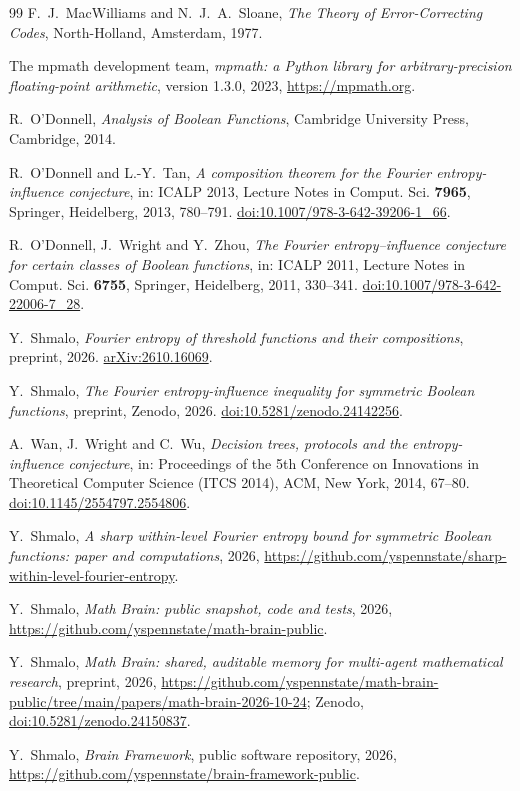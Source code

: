 \documentclass[11pt]{amsart}
\theoremstyle{remark}
\begin{document}
\begin{thebibliography}{99}
F.~J.~MacWilliams and N.~J.~A.~Sloane,
\emph{The Theory of Error-Correcting Codes},
North-Holland, Amsterdam, 1977.

The mpmath development team,
\emph{mpmath: a Python library for arbitrary-precision floating-point arithmetic}, version 1.3.0, 2023,
\url{https://mpmath.org}.

R.~O'Donnell,
\emph{Analysis of Boolean Functions},
Cambridge University Press, Cambridge, 2014.

R.~O'Donnell and L.-Y.~Tan,
\emph{A composition theorem for the Fourier entropy-influence conjecture},
in: ICALP 2013, Lecture Notes in Comput. Sci. \textbf{7965}, Springer, Heidelberg, 2013, 780--791.
\href{https://doi.org/10.1007/978-3-642-39206-1_66}{doi:10.1007/978-3-642-39206-1\_66}.

R.~O'Donnell, J.~Wright and Y.~Zhou,
\emph{The Fourier entropy--influence conjecture for certain classes of Boolean functions},
in: ICALP 2011, Lecture Notes in Comput. Sci. \textbf{6755}, Springer, Heidelberg, 2011, 330--341.
\href{https://doi.org/10.1007/978-3-642-22006-7_28}{doi:10.1007/978-3-642-22006-7\_28}.

Y.~Shmalo,
\emph{Fourier entropy of threshold functions and their compositions},
preprint, 2026.
\href{https://arxiv.org/abs/2610.16069}{arXiv:2610.16069}.

Y.~Shmalo,
\emph{The Fourier entropy-influence inequality for symmetric Boolean functions},
preprint, Zenodo, 2026.
\href{https://doi.org/10.5281/zenodo.24142256}{doi:10.5281/zenodo.24142256}.

A.~Wan, J.~Wright and C.~Wu,
\emph{Decision trees, protocols and the entropy-influence conjecture},
in: Proceedings of the 5th Conference on Innovations in Theoretical Computer Science (ITCS 2014), ACM, New York, 2014, 67--80.
\href{https://doi.org/10.1145/2554797.2554806}{doi:10.1145/2554797.2554806}.

Y.~Shmalo,
\emph{A sharp within-level Fourier entropy bound for symmetric Boolean functions: paper and computations},
2026, \url{https://github.com/yspennstate/sharp-within-level-fourier-entropy}.

 Y.~Shmalo, \emph{Math Brain: public snapshot, code and tests}, 2026, \url{https://github.com/yspennstate/math-brain-public}.

 Y.~Shmalo, \emph{Math Brain: shared, auditable memory for multi-agent mathematical research}, preprint, 2026, \url{https://github.com/yspennstate/math-brain-public/tree/main/papers/math-brain-2026-10-24}; Zenodo, \href{https://doi.org/10.5281/zenodo.24150837}{doi:10.5281/zenodo.24150837}.

 Y.~Shmalo, \emph{Brain Framework}, public software repository, 2026, \url{https://github.com/yspennstate/brain-framework-public}.
\end{thebibliography}
\end{document}
